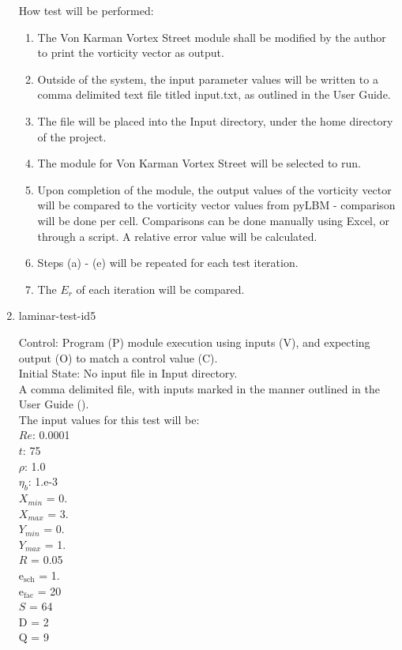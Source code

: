 \documentclass[12pt, titlepage]{article}
\begin{document}
\begin{enumerate}
How test will be performed: 

\begin{enumerate}
\item The Von Karman Vortex Street module shall be modified by the author to print the vorticity vector as output.
\item Outside of the system, the input parameter values will be written to a comma delimited text file titled input.txt, as outlined in the User Guide.
\item The file will be placed into the Input directory, under the home directory of the project.
\item The module for Von Karman Vortex Street will be selected to run.
\item Upon completion of the module, the output values of the vorticity vector will be compared to the vorticity vector values from pyLBM - comparison will be done per cell. Comparisons can be done manually using Excel, or through a script. A relative error value will be calculated.\\
\item Steps (a) - (e) will be repeated for each test iteration.
\item The $E_r$ of each iteration will be compared.\\
\end{enumerate}
					
\item{laminar-test-id5\\}

Control: Program (P) module execution using inputs (V), and expecting output (O) to match a control value (C).\\
					
Initial State: No input file in Input directory.\\
					
A comma delimited file, with inputs marked in the manner outlined in the User Guide (\citet{LBM_UserGuide_PM}).\\The input values for this test will be:\\
$Re$: 0.0001\\
$t$: 75\\
$\rho$: 1.0\\
$\eta_b$: 1.e-3\\
$X_{min}$ = 0.\\
$X_{max}$ = 3.\\
$Y_{min}$ = 0.\\
$Y_{max}$ = 1.\\
$R$ = 0.05\\
$\mathrm{e_{sch}}$ = 1.\\
$\mathrm{e_{fac}}$ = 20\\
$S$ = 64\\
$\mathrm{D}$ = 2\\
$\mathrm{Q}$ = 9\\
					

\end{enumerate}
\end{document}
